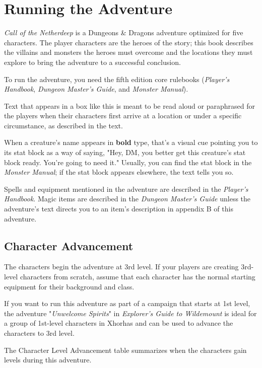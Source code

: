 \documentclass[10pt,a4paper,twoside,bg=print,twocolumn,openany,nodeprecatedcode]{dndbook}
\begin{document}
\section{Running the Adventure}
\textit{Call of the Netherdeep} is a Dungeons \& Dragons adventure optimized for five characters. The player characters are the heroes of the story; this book describes the villains and monsters the heroes must overcome and the locations they must explore to bring the adventure to a successful conclusion.

To run the adventure, you need the fifth edition core rulebooks (\textit{Player's Handbook}, \textit{Dungeon Master's Guide}, and \textit{Monster Manual}).

\begin{DndReadAloud}{}
Text that appears in a box like this is meant to be read aloud or paraphrased for the players when their characters first arrive at a location or under a specific circumstance, as described in the text.

\end{DndReadAloud}

When a creature's name appears in \textbf{bold} type, that's a visual cue pointing you to its stat block as a way of saying, "Hey, DM, you better get this creature's stat block ready. You're going to need it." Usually, you can find the stat block in the \textit{Monster Manual}; if the stat block appears elsewhere, the text tells you so.

Spells and equipment mentioned in the adventure are described in the \textit{Player's Handbook}. Magic items are described in the \textit{Dungeon Master's Guide} unless the adventure's text directs you to an item's description in appendix B of this adventure.

\subsection{Character Advancement}
The characters begin the adventure at 3rd level. If your players are creating 3rd-level characters from scratch, assume that each character has the normal starting equipment for their background and class.

If you want to run this adventure as part of a campaign that starts at 1st level, the adventure "\textit{Unwelcome Spirits}" in \textit{Explorer's Guide to Wildemount} is ideal for a group of 1st-level characters in Xhorhas and can be used to advance the characters to 3rd level.

The Character Level Advancement table summarizes when the characters gain levels during this adventure.
\end{document}
